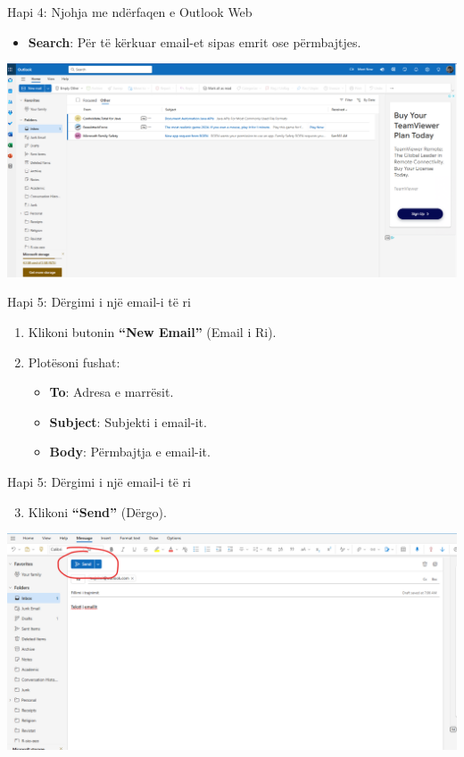 \documentclass[
  ignorenonframetext,
]{beamer}
\providecommand{\tightlist}{%
  \setlength{\itemsep}{0pt}\setlength{\parskip}{0pt}}
\begin{document}
\begin{frame}{Hapi 4: Njohja me ndërfaqen e Outlook Web}
\label{hapi-4-njohja-me-nduxebrfaqen-e-outlook-web-1}
\begin{itemize}
\tightlist
\item
  \textbf{Search}: Për të kërkuar email-et sipas emrit ose përmbajtjes.
\end{itemize}

\includegraphics{./images/outlook4.png}
\end{frame}

\begin{frame}{Hapi 5: Dërgimi i një email-i të ri}
\label{hapi-5-duxebrgimi-i-njuxeb-email-i-tuxeb-ri}
\begin{enumerate}
\item
  Klikoni butonin \textbf{``New Email''} (Email i Ri).
\item
  Plotësoni fushat:

  \begin{itemize}
  \item
    \textbf{To}: Adresa e marrësit.
  \item
    \textbf{Subject}: Subjekti i email-it.
  \item
    \textbf{Body}: Përmbajtja e email-it.
  \end{itemize}
\end{enumerate}
\end{frame}

\begin{frame}{Hapi 5: Dërgimi i një email-i të ri}
\label{hapi-5-duxebrgimi-i-njuxeb-email-i-tuxeb-ri-1}
\begin{enumerate}
\setcounter{enumi}{2}
\tightlist
\item
  Klikoni \textbf{``Send''} (Dërgo).
\end{enumerate}

\includegraphics{./images/outlook5.png}
\end{frame}
\end{document}
